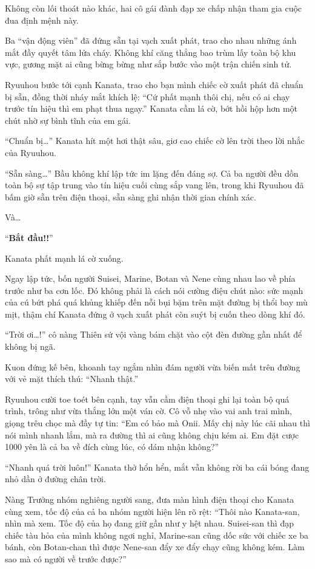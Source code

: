 \documentclass[../main.tex]{subfiles}
\begin{document}
Không còn lối thoát nào khác, hai cô gái đành đạp xe chấp nhận tham gia cuộc đua định mệnh này.

Ba ``vận động viên'' đã đứng sẵn tại vạch xuất phát, trao cho nhau những ánh mắt đầy quyết tâm lửa cháy. Không khí căng thẳng bao trùm lấy toàn bộ khu vực, gương mặt ai cũng bừng bừng như sắp bước vào một trận chiến sinh tử.

Ryuuhou bước tới cạnh Kanata, trao cho bạn mình chiếc cờ xuất phát đã chuẩn bị sẵn, đồng thời nháy mắt khích lệ: ``Cứ phất mạnh thôi chị, nếu có ai chạy trước tín hiệu thì em phạt thua ngay.'' Kanata cầm lá cờ, bớt hồi hộp hơn một chút nhờ sự bình tĩnh của em gái.

``Chuẩn bị\dots'' Kanata hít một hơi thật sâu, giơ cao chiếc cờ lên trời theo lời nhắc của Ryuuhou.

``Sẵn sàng\dots'' Bầu không khí lập tức im lặng đến đáng sợ. Cả ba người đều dồn toàn bộ sự tập trung vào tín hiệu cuối cùng sắp vang lên, trong khi Ryuuhou đã bấm giờ sẵn trên điện thoại, sẵn sàng ghi nhận thời gian chính xác.

Và\dots

``\textbf{Bắt đầu!!}''

Kanata phất mạnh lá cờ xuống.

Ngay lập tức, bốn người Suisei, Marine, Botan và Nene cùng nhau lao về phía trước như ba cơn lốc. Đó không phải là cách nói cường điệu chút nào: sức mạnh của cú bứt phá quá khủng khiếp đến nỗi bụi bặm trên mặt đường bị thổi bay mù mịt, thậm chí Kanata đứng ở vạch xuất phát còn suýt bị cuốn theo dòng khí đó.

``Trời ơi\dots!'' cô nàng Thiên sứ vội vàng bám chặt vào cột đèn đường gần nhất để không bị ngã.

Kuon đứng kế bên, khoanh tay ngắm nhìn đám người vừa biến mất trên đường với vẻ mặt thích thú: ``Nhanh thật.''

Ryuuhou cười toe toét bên cạnh, tay vẫn cầm điện thoại ghi lại toàn bộ quá trình, trông như vừa thắng lớn một ván cờ. Cô vỗ nhẹ vào vai anh trai mình, giọng trêu chọc mà đầy tự tin: ``Em có bảo mà Onii. Mấy chị này lúc cãi nhau thì nói mình nhanh lắm, mà ra đường thì ai cũng không chịu kém ai. Em đặt cược 1000 yên là cả ba về đích cùng lúc, có dám nhận không?''

``Nhanh quá trời luôn!'' Kanata thở hổn hển, mắt vẫn không rời ba cái bóng đang nhỏ dần ở đường chân trời.

Nàng Trưởng nhóm nghiêng người sang, đưa màn hình điện thoại cho Kanata cùng xem, tốc độ của cả ba nhóm người hiện lên rõ rệt: ``Thôi nào Kanata-san, nhìn mà xem. Tốc độ của họ đang giữ gần như y hệt nhau. Suisei-san thì đạp chiếc tàu hỏa của mình không ngơi nghỉ, Marine-san cũng dốc sức với chiếc xe ba bánh, còn Botan-chan thì được Nene-san đẩy xe đẩy chạy cũng không kém. Làm sao mà có người về trước được?''
\end{document}
